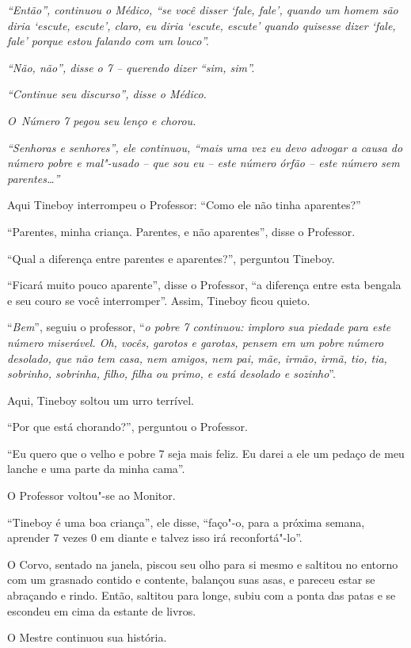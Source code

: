 \emph{``Então'', continuou o Médico, ``se você disser `fale, fale',
quando um homem são diria `escute, escute', claro, eu diria `escute,
escute' quando quisesse dizer `fale, fale' porque estou falando com um
louco''.}

\emph{``Não, não'', disse o 7 -- querendo dizer ``sim, sim''.}

\emph{``Continue seu discurso'', disse o Médico.}

\emph{O~Número 7 pegou seu lenço e chorou.}

\emph{``Senhoras e senhores'', ele continuou, ``mais uma vez eu devo
advogar a causa do número pobre e mal"-usado -- que sou eu -- este número
órfão -- este número sem parentes…''}

Aqui Tineboy interrompeu o Professor: ``Como ele não tinha aparentes?''

``Parentes, minha criança. Parentes, e não aparentes'', disse o
Professor.

``Qual a diferença entre parentes e aparentes?'', perguntou Tineboy.

``Ficará muito pouco aparente'', disse o Professor, ``a diferença entre
esta bengala e seu couro se você interromper''. Assim, Tineboy ficou
quieto.

``\emph{Bem}'', seguiu o professor, ``\emph{o pobre 7 continuou: imploro
sua piedade para este número miserável. Oh, vocês, garotos e garotas,
pensem em um pobre número desolado, que não tem casa, nem amigos, nem
pai, mãe, irmão, irmã, tio, tia, sobrinho, sobrinha, filho, filha ou
primo, e está desolado e sozinho}''.

Aqui, Tineboy soltou um urro terrível.

``Por que está chorando?'', perguntou o Professor.

``Eu quero que o velho e pobre 7 seja mais feliz. Eu darei a ele um
pedaço de meu lanche e uma parte da minha cama''.

O Professor voltou"-se ao Monitor.

``Tineboy é uma boa criança'', ele disse, ``faço"-o, para a próxima
semana, aprender 7 vezes 0 em diante e talvez isso irá reconfortá"-lo''.

O Corvo, sentado na janela, piscou seu olho para si mesmo e saltitou no
entorno com um grasnado contido e contente, balançou suas asas, e
pareceu estar se abraçando e rindo. Então, saltitou para longe, subiu
com a ponta das patas e se escondeu em cima da estante de livros.

O Mestre continuou sua história.

